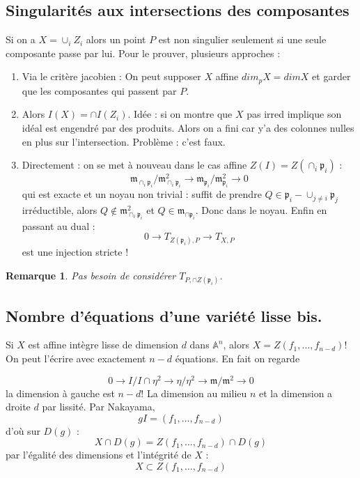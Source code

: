 \documentclass[a4paper,12pt]{book}
\newcommand{\A}{\mathbb{A}}
\newcommand{\m}{\mathfrak{m}}
\newcommand{\p}{\mathfrak{p}}
\theoremstyle{plain}
\newtheorem{rem}{Remarque}
\theoremstyle{definition}
\theoremstyle{remark}
\begin{document}
\subsection{Singularités aux intersections des composantes}
Si on a $X=\cup_i Z_i$ alors un point $P$ est non singulier 
seulement si une seule composante passe par lui. Pour le prouver,
plusieurs approches :
\begin{enumerate}
    \item Via le critère jacobien : On peut supposer $X$ affine
        $dim_p X= dim X$ et garder que les composantes qui passent
        par $P$.
    \item Alors $I(X)=\cap I(Z_i)$. Idée : si on montre que 
        $X$ pas irred implique son idéal est engendré par des 
        produits. Alors on a fini car y'a des colonnes nulles en
        plus sur l'intersection. Problème : c'est faux.

    \item Directement : on se met à nouveau dans le cas affine
        $Z(I)=Z(\cap_i \p_i)$ :
        \[\m_{\cap_i\p_i}/\m_{\cap_i\p_i}^2\to \m_{\p_i}/\m_{\p_i}^2\to 0\]
        qui est exacte et un noyau non trivial : suffit de prendre
        $Q\in \p_i - \cup_{j\ne i} \p_j$ irréductible, alors 
        $Q\notin \m_{\cap_i\p_i}^2$ et $Q\in\m_{\cap \p_i}$. Donc
        dans le noyau. Enfin en passant au dual :
        \[0\to T_{Z(\p_i),P}\to T_{X,P}\]
        est une injection stricte ! 
\end{enumerate}
\begin{rem}
    Pas besoin de considérer $T_{P,\cap Z(\p_i)}$.
\end{rem}

\subsection{Nombre d'équations d'une variété lisse bis.}
Si $X$ est affine intègre lisse de dimension $d$ dans $\A^n$, 
alors $X=Z(f_1,\ldots, f_{n-d})$! On peut l'écrire avec exactement
$n-d$ équations. En fait on regarde

\[0\to I/I\cap \eta^2\to \eta/\eta^2\to \m/\m^2\to 0\]
la dimension à gauche est $n-d$! La dimension au milieu $n$ et
la dimension a droite $d$ par lissité. Par Nakayama, 
\[gI=(f_1,\ldots, f_{n-d})\]
d'où sur $D(g)$ :
\[X\cap D(g)=Z(f_1,\ldots, f_{n-d})\cap D(g)\]
par l'égalité des dimensions et l'intégrité de $X$ :
\[X\subset Z(f_1,\ldots, f_{n-d})\]
\end{document}
